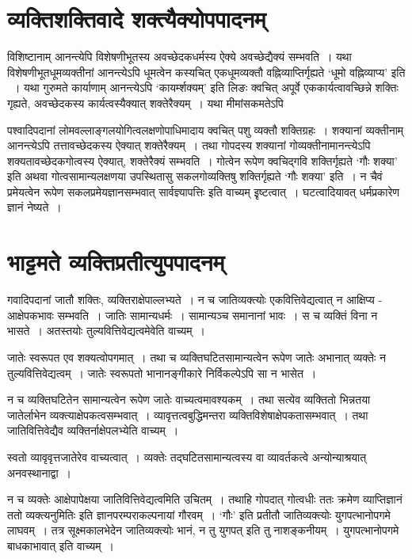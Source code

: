 {\section*{व्यक्तिशक्तिवादे शक्त्यैक्योपपादनम्}

विशिष्टानाम् आनन्त्येपि विशेषणीभूतस्य अवच्छेदकधर्मस्य ऐक्ये अवच्छेद्यैक्यं सम्भवति~। यथा विशेषणीभूतधूमव्यक्तीनां आनन्त्येऽपि धूमत्वेन कस्यचित् एकधूमव्यक्तौ वह्निव्याप्तिर्गृह्यते ‘धूमो वह्निव्याप्य’ इति ~। यथा गुरुमते कार्याणाम् आनन्त्येऽपि ‘कायर्म्शक्यम्’ इति लिङः क्वचित् अपूर्वे एककार्यत्वावच्छिन्ने शक्तिः गृह्यते, अवच्छेदकस्य कार्यत्वस्यैक्यात् \-शक्तेरैक्यम्~। यथा मीमांसकमतेऽपि 	

पश्वादिपदानां लोमवल्लाङ्गलयोगित्वलक्षणोपाधिमादाय क्वचित् पशु व्यक्तौ शक्तिग्रहः~। शक्यानां व्यक्तीनाम् आनन्त्येऽपि तत्तावच्छेदकस्य ऐक्यात् शक्तेरैक्यम्~। तथा गोपदस्य शक्यानां गोव्यक्तीनामानन्त्येऽपि शक्यतावच्छेदकगोत्वस्य ऐक्यात्, शक्तेरैक्यं सम्भवति~। { गोत्वेन रूपेण क्वचिद्गवि शक्तिर्गृह्यते ‘गौः शक्या’ इति } अथवा गोत्वसामान्यलक्षणया उपस्थितासु सकलगोव्यक्तिषु शक्तिर्गृह्यते ‘गौः शक्या’ इति~। न चैवं प्रमेयत्वेन रूपेण सकलप्रमेयज्ञानसम्भवात् सार्वज्ञ्यापत्तिः इति वाच्यम्  इृष्टत्वात्~। घटत्वादियावत् धर्मप्रकारेण ज्ञानं नेष्यते~। 

\section*{भाट्टमते व्यक्तिप्रतीत्युपपादनम्}

गवादिपदानां जातौ शक्तिः, व्यक्तिराक्षेपाल्लभ्यते~। न च जातिव्यक्त्योः एकवित्तिवेद्यत्वात् न आक्षिप्य - आक्षेपकभावः सम्भवति~। जातिः सामान्यधर्मः~। सामान्यञ्च समानानां भावः~। स च व्यक्तिं विना न भासते~। अतस्तयोः तुल्यवित्तिवेद्यत्वमेवेति वाच्यम्~। 

जातेः स्वरूपत एव शक्यत्वोपगमात्~। तथा च व्यक्तिघटितसामान्यत्वेन रूपेण जातेः अभानात् व्यक्तेः न तुल्यवित्तिवेद्यत्वम्~। जातेः स्वरूपतो भानानङ्गीकारे  निर्विकल्पेऽपि सा न भासेत~। 

न च व्यक्तिघटितेन सामान्यत्वेन रूपेण जातेः वाच्यत्वमावश्यकम्~। तथा सत्येव व्यक्तितो भिन्नतया जातेर्लाभेन व्यक्त्याक्षेपकत्वसम्भवात्~। व्यावृत्तत्वबुद्धिमन्तरा व्यक्तिविशेषाक्षेपकतासम्भवात्~। तथा जातिवित्तिवेद्यैव व्यक्तिर्नाक्षेपलभ्येति वाच्यम्~। 

स्वतो व्यावृवृत्तजातेरेव वाच्यत्वात्~। व्यक्तेः तद्घटितसामान्यत्वस्य वा व्यावर्तकत्वे अन्योन्याश्रयात्  अनवस्थानाद्वा~। 

न च व्यक्तेः आक्षेपापेक्षया जातिवित्तिवेद्यत्वमिति उचितम्~। तथाहि गोपदात् गोत्वधीः ततः क्रमेण व्याप्तिज्ञानं ततो व्यक्त्यनुमितिः इति ज्ञानपरम्पराकल्पनायां गौरवम्~। ‘गौः’ इति प्रतीतौ जातिव्यक्त्योः युगपत्भानोपगमे लाघवम्~। तत्र सूक्ष्मकालभेदेन जातिव्यक्त्योः भानं, न तु युगपत् इति तु नाशङ्कनीयम्~। युगपत्भानोपगमे बाधकाभावात् इति वाच्यम्~। 

}

